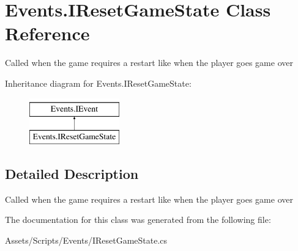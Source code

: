 \hypertarget{class_events_1_1_i_reset_game_state}{}\section{Events.\+I\+Reset\+Game\+State Class Reference}
\label{class_events_1_1_i_reset_game_state}


Called when the game requires a restart like when the player goes game over  


Inheritance diagram for Events.\+I\+Reset\+Game\+State\+:\begin{figure}[H]
\begin{center}
\leavevmode
\includegraphics[height=2.000000cm]{class_events_1_1_i_reset_game_state}
\end{center}
\end{figure}


\subsection{Detailed Description}
Called when the game requires a restart like when the player goes game over 



The documentation for this class was generated from the following file\+:\begin{DoxyCompactItemize}
\item 
Assets/\+Scripts/\+Events/I\+Reset\+Game\+State.\+cs\end{DoxyCompactItemize}
